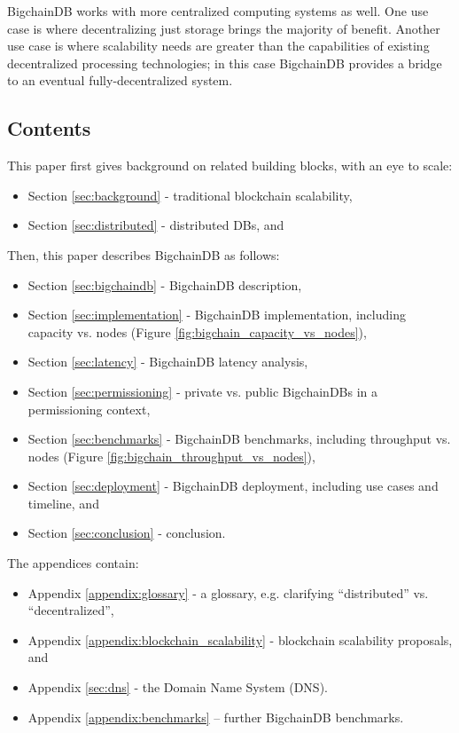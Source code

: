 BigchainDB works with more centralized computing systems as well.
One use case is where decentralizing just storage brings the majority of benefit.
Another use case is where scalability needs are greater than the capabilities of existing decentralized processing technologies; in this case BigchainDB provides a bridge to an eventual fully-decentralized system.

\subsection{Contents}

This paper first gives background on related building blocks, with an eye to scale:
\begin{itemize}
 \item Section \ref{sec:background} - traditional blockchain scalability,
 \item Section \ref{sec:distributed} - distributed DBs, and
\end{itemize}


Then, this paper describes BigchainDB as follows:
\begin{itemize}
 \item Section \ref{sec:bigchaindb} - BigchainDB description,
 \item Section \ref{sec:implementation} - BigchainDB implementation, including capacity vs. nodes (Figure \ref{fig:bigchain_capacity_vs_nodes}),
 \item Section \ref{sec:latency} - BigchainDB latency analysis,
 \item Section \ref{sec:permissioning} - private vs. public BigchainDBs in a permissioning context,
 \item Section \ref{sec:benchmarks} - BigchainDB benchmarks, including throughput vs. nodes (Figure \ref{fig:bigchain_throughput_vs_nodes}),
 \item Section \ref{sec:deployment} - BigchainDB deployment, including use cases and timeline, and
 \item Section \ref{sec:conclusion} - conclusion.
\end{itemize}


The appendices contain:
\begin{itemize}
 \item Appendix \ref{appendix:glossary} - a glossary, e.g. clarifying “distributed” vs. “decentralized”,
 \item Appendix \ref{appendix:blockchain_scalability} - blockchain scalability proposals, and
 \item Appendix \ref{sec:dns} - the Domain Name System (DNS).
 \item Appendix \ref{appendix:benchmarks} – further BigchainDB benchmarks.
\end{itemize}